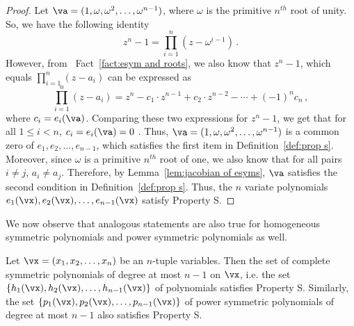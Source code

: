 \begin{proof}
Let $\va = (1, \omega, \omega^2, \ldots, \omega^{n-1})$, where $\omega$ is the primitive $n^{th}$ root of unity. So, we have the following identity 
\[
z^n-1 = \prod_{i=1}^{n} (z-\omega^{i-1}) \, .
 \] 
However, from ~Fact~\ref{fact:esym and roots}, we also know that $z^n - 1$, which equals $\prod_{i = 1}^n (z-a_i)$ can be expressed as
\[
\prod_{i = 1}^n (z-a_i) = z^{n} - c_1\cdot z^{n-1} + c_2\cdot z^{n-2}- \cdots + (-1)^{n} c_n \, ,
\]
where $c_i = e_i(\va)$.  
Comparing these two expressions for $z^n -1$, we get that for all $1\leq i < n$, $c_i = e_i(\va)=0$ . Thus, $\va=(1, \omega, \omega^2, \ldots, \omega^{n-1})$ is a common zero of $e_1, e_2, \ldots, e_{n-1}$, which satisfies the first item in Definition~\ref{def:prop s}. Moreover, since $\omega$ is a primitive $n^{th}$ root of one, we also know that for all pairs $i \neq j$, $a_i \neq a_j$. Therefore, by Lemma~\ref{lem:jacobian of esyms}, $\va$ satisfies the second condition in Definition~\ref{def:prop s}. Thus, the $n$ variate polynomials $e_1(\vx), e_2(\vx), \ldots, e_{n-1}(\vx)$ satisfy Property S.  
\end{proof}

%
%
%
%
%
%
%
%
%
%
%
%
%
We now observe that analogous statements are also true for homogeneous symmetric polynomials and power symmetric polynomials as well.  
\begin{lemma}\label{lem:hsym psym prop S} 
Let $\vx = (x_1, x_2, \ldots, x_n)$ be an $n$-tuple variables. Then the set of complete symmetric polynomials of degree at most $n-1$ on $\vx$, i.e. the set $\{h_1(\vx), h_2(\vx), \ldots, h_{n-1}(\vx)\}$ of polynomials satisfies Property S. Similarly, the set $\{p_1(\vx), p_2(\vx), \ldots, p_{n-1}(\vx)\}$ of power symmetric polynomials of degree at most $n-1$ also satisfies Property S.
\end{lemma}

